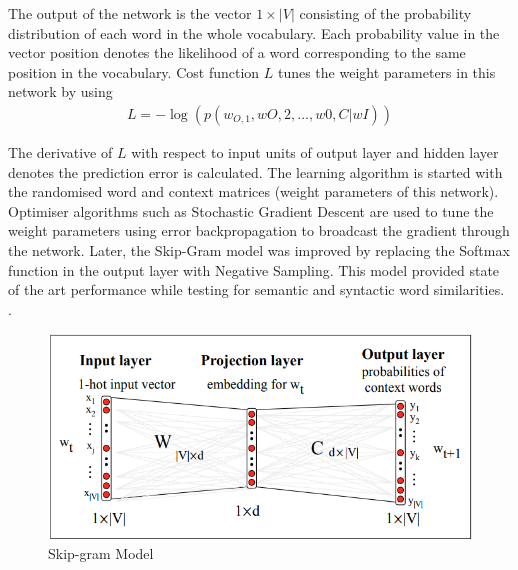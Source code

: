 \documentclass[12pt]{report} %
\begin{document}
The output of the network is the vector $1\times|V|$ consisting of the probability distribution of each word in the whole vocabulary. Each probability value in the vector position denotes the likelihood of a word corresponding to the same position in the vocabulary. Cost function $L$ tunes the weight parameters in this network by using 
\begin{align}
L = - \log ( p(w_{O,1}, wO,2, . . . , w0,C|wI))
\end{align} 

The derivative of $L$ with respect to input units of output layer and hidden layer denotes the prediction error is calculated. The learning algorithm is started with the randomised word and context matrices (weight parameters of this network). Optimiser algorithms such as Stochastic Gradient Descent are used to tune the weight parameters using error backpropagation to broadcast the gradient through the network. Later, the Skip-Gram model was improved by replacing the Softmax function in the output layer with Negative Sampling. This model provided state of the art performance while testing for semantic and syntactic word similarities. \citep{mikolov2014word2vec}. 


\begin{figure}[!tbp]
	\centering
	\includegraphics[scale=0.50]{image/skip-gram.png}
	\caption{Skip-gram Model \citep{jurafsky2014speech}}
	\label{skipgram}
\end{figure}
\end{document}
